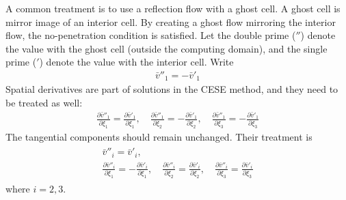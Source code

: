 \documentclass[a4paper,12pt,dvips]{article}
\begin{document}
A common treatment is to use a reflection flow with a ghost cell.  A ghost cell
is mirror image of an interior cell.  By creating a ghost flow mirroring the
interior flow, the no-penetration condition is satisfied.  Let the double prime
(${}''$) denote the value with the ghost cell (outside the computing domain),
and the single prime (${}'$) denote the value with the interior cell.  Write
\begin{align*}
  \bar{v}''_1 = -\bar{v}'_1
\end{align*}
Spatial derivatives are part of solutions in the CESE method, and they need to
be treated as well:
\begin{align*}
  \frac{\partial \bar{v}''_1}{\partial\xi_1} =
  \frac{\partial \bar{v}'_1}{\partial\xi_1}, \quad
  \frac{\partial \bar{v}''_1}{\partial\xi_2} =
  -\frac{\partial \bar{v}'_1}{\partial\xi_2}, \quad
  \frac{\partial \bar{v}''_1}{\partial\xi_3} =
  -\frac{\partial \bar{v}'_1}{\partial\xi_3}
\end{align*}
The tangential components should remain unchanged.  Their treatment is
\begin{align*}
\begin{gathered}
  \bar{v}''_i = \bar{v}'_i, \\
  \frac{\partial \bar{v}''_i}{\partial\xi_1} =
  -\frac{\partial \bar{v}'_i}{\partial\xi_1}, \quad
  \frac{\partial \bar{v}''_i}{\partial\xi_2} =
  \frac{\partial \bar{v}'_i}{\partial\xi_2}, \quad
  \frac{\partial \bar{v}''_i}{\partial\xi_3} =
  \frac{\partial \bar{v}'_i}{\partial\xi_3}
\end{gathered}
\end{align*}
where $i = 2, 3$.
\end{document}
